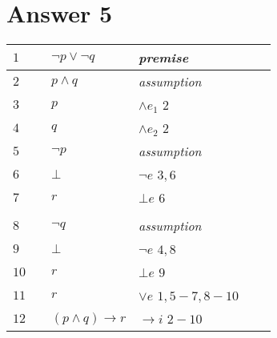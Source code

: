 \documentclass[12pt]{article}
\begin{document}
\section*{Answer 5}
\begin{table}[H]
	\centering
\begin{tabular}{*6{l}}
	$1$ & &  $\neg p \lor \neg q $ & \textit{premise} & \\ \hline \hline
	
	$2$ & &  $p \land q$ &\textit{assumption} & \\ 
	
	$3$ & &  $p$ & $\land e_1$ $2$ & \\ 
	
	$4$ & &  $q$ & $\land e_2$ $2$ & \\ \hline
	
	$5$ & &  $\neg p$ &  \textit{assumption} & \\ 
	
	$6$ & &  $\bot $ & $\neg e$ $3,6$ &  \\ 
	
	$7$ & &  $r $ & $\bot e$ $6$ & \\ \hline
	
	& & & & \\ \hline
	
	$8$ & &  $\neg q$ & \textit{assumption} \\ 
	
	$9$ & &  $\bot $ & $\neg e$ $4,8$ &  \\ 
	
	$10$ & &  $r $ & $\bot e$ $9$ & \\ \hline
	
	$11$ & & $r $ & $\lor e$ $1, 5-7,8-10$ & \\ \hline \hline
	
	$12$ & & $(p\land q) \to r$ & $\to  i$ $2-10$
	
	
\end{tabular}
\end{table}
\end{document}
